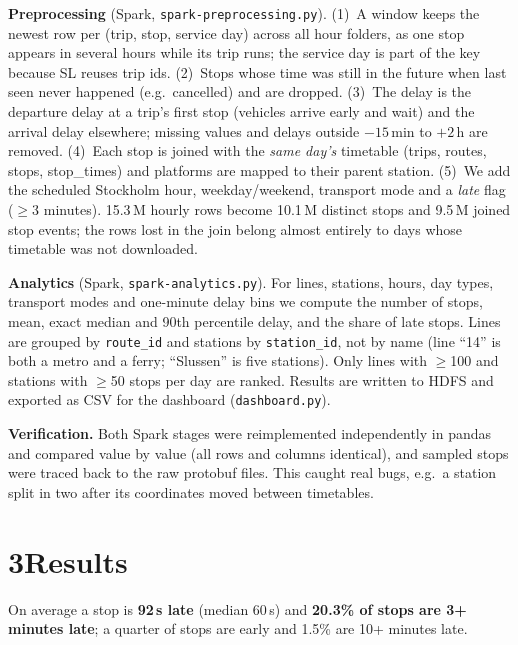 \documentclass[10pt,a4paper]{article}
\begin{document}
\textbf{Preprocessing} (Spark, \texttt{spark-preprocessing.py}). (1)~A window keeps the newest row
per (trip, stop, service day) across all hour folders, as one stop appears in several hours while its
trip runs; the service day is part of the key because SL reuses trip ids. (2)~Stops whose time was still
in the future when last seen never happened (e.g.\ cancelled) and are dropped. (3)~The delay is the
departure delay at a trip's first stop (vehicles arrive early and wait) and the arrival delay elsewhere;
missing values and delays outside $-15$\,min to $+2$\,h are removed. (4)~Each stop is joined with the
\emph{same day's} timetable (trips, routes, stops, stop\_times) and platforms are mapped to their parent
station. (5)~We add the scheduled Stockholm hour, weekday/weekend, transport mode and a \emph{late} flag
($\geq$3 minutes). 15.3\,M hourly rows become 10.1\,M distinct stops and 9.5\,M joined stop events; the
rows lost in the join belong almost entirely to days whose timetable was not downloaded.

\textbf{Analytics} (Spark, \texttt{spark-analytics.py}). For lines, stations, hours, day types, transport
modes and one-minute delay bins we compute the number of stops, mean, exact median and 90th percentile
delay, and the share of late stops. Lines are grouped by \texttt{route\_id} and stations by
\texttt{station\_id}, not by name (line ``14'' is both a metro and a ferry; ``Slussen'' is five
stations). Only lines with $\geq$100 and stations with $\geq$50 stops per day are ranked. Results are
written to HDFS and exported as CSV for the dashboard (\texttt{dashboard.py}).

\textbf{Verification.} Both Spark stages were reimplemented independently in pandas and compared value by
value (all rows and columns identical), and sampled stops were traced back to the raw protobuf files.
This caught real bugs, e.g.\ a station split in two after its coordinates moved between timetables.

\section*{3\quad Results}
On average a stop is \textbf{92\,s late} (median 60\,s) and \textbf{20.3\% of stops are 3+ minutes late};
a quarter of stops are early and 1.5\% are 10+ minutes late.
\end{document}
